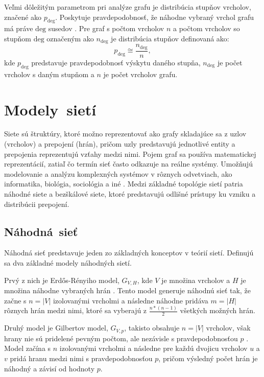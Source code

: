 Veľmi dôležitým parametrom pri analýze grafu je distribúcia stupňov vrcholov, značené ako $p_{\mathrm{deg}}$.
Poskytuje pravdepodobnosť, že náhodne vybraný vrchol grafu má práve $\mathrm{deg}$ susedov \cite{barabasi2016network} .
Pre graf s počtom vrcholov $n$ a počtom vrcholov so stupňom $\mathrm{deg}$ označeným ako $n_{\mathrm{deg}}$ je distribúcia stupňov definovaná ako:
\begin{equation}
    p_{\mathrm{deg}} \cong \frac{n_{\mathrm{deg}}}{n},
    \label{eq:degree_distribution}
\end{equation}
kde $p_{\mathrm{deg}}$ predstavuje pravdepodobnosť výskytu daného stupňa, $n_{\mathrm{deg}}$ je počet vrcholov s daným stupňom a $n$ je počet vrcholov grafu.

\section{Modely~sietí}\label{sec:network-models}

Siete sú štruktúry, ktoré možno reprezentovať ako grafy skladajúce sa z uzlov (vrcholov) a prepojení (hrán), pričom uzly predstavujú jednotlivé entity
a prepojenia reprezentujú vzťahy medzi nimi. Pojem graf sa používa matematickej reprezentácií, zatiaľ čo termín sieť
často odkazuje na reálne systémy. Umožňujú modelovanie a analýzu komplexných systémov v rôznych odvetviach,
ako informatika, biológia, sociológia a iné \cite{barabasi2016network} . Medzi základné topológie sietí patria náhodné siete a bezškálové siete,
ktoré predstavujú odlišné prístupy ku vzniku a distribúcii prepojení.


\subsection{Náhodná~sieť}\label{sec:random-network}

Náhodná sieť predstavuje jeden zo základných konceptov v teórií sietí. Definujú sa dva základné modely náhodných sietí.

Prvý z nich je Erdős-Rényiho model, $G_{V,H}$, kde $V$ je množina vrcholov a $H$ je množina náhodne vybraných hrán \cite{erdos1959random}\cite{barabasi2016network} .
Tento model generuje náhodnú sieť tak, že začne s $n = |V|$ izolovanými vrcholmi a následne náhodne pridáva $m = |H|$ rôznych hrán medzi nimi,
ktoré sa vyberajú z $\frac{n*(n-1)}{2}$ všetkých možných hrán.

Druhý model je Gilbertov model, $G_{V,p}$, takisto obsahuje $n = |V|$ vrcholov, však hrany nie sú pridelené pevným počtom,
ale nezávisle s pravdepodobnosťou $p$ \cite{gilbert1959random}\cite{barabasi2016network} . Model začína s $n$ izolovanými vrcholmi a následne pre každú dvojicu vrcholov
$u$ a $v$ pridá hranu medzi nimi s pravdepodobnosťou $p$, pričom výsledný počet hrán je náhodný a závisí od hodnoty $p$.

